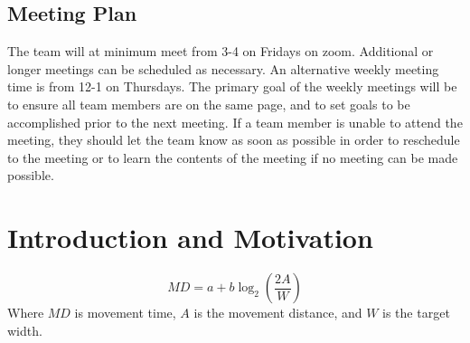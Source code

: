 \documentclass[table,12pt]{article}
\begin{document}
\subsection{Meeting Plan}
The team will at minimum meet from 3-4 on Fridays on zoom. Additional or longer meetings can be scheduled as necessary. An alternative weekly meeting time is from 12-1 on Thursdays. The primary goal of the weekly meetings will be to ensure all team members are on the same page, and to set goals to be accomplished prior to the next meeting. If a team member is unable to attend the meeting, they should let the team know as soon as possible in order to reschedule to the meeting or to learn the contents of the meeting if no meeting can be made possible.

\section{Introduction and Motivation}
\begin{equation}
    MD = a + b \log_2 \left(\frac{2A}{W}\right) \label{eq:fitts_law}
\end{equation}
Where $MD$ is movement time, $A$ is the movement distance, and $W$ is the target width. 
\end{document}
